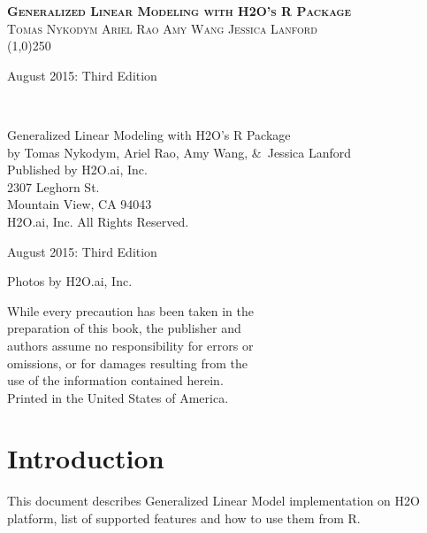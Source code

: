 \documentclass{article}[11pt]
\begin{document}
\thispagestyle{empty} %

\begin{center}
\textsc{\Large\bf{Generalized Linear Modeling  with H2O's R Package}}
\\
\bigskip
\textsc{\small{Tomas Nykodym \hspace{40pt} Ariel Rao \hspace{40pt} Amy Wang \hspace{40pt} Jessica Lanford}}
\\
\bigskip
\line(1,0){250}  %

\bigskip
August 2015: Third Edition 
\\%
\bigskip
\end{center}

{\raggedright\vfill\ 

Generalized Linear Modeling  with H2O's R Package\\
  by Tomas Nykodym, Ariel Rao, Amy Wang, \&\ Jessica Lanford \\
\bigskip
  Published by H2O.ai, Inc. \\
2307 Leghorn St. \\
Mountain View, CA 94043\\
\bigskip
{} H2O.ai, Inc. All Rights Reserved. 
\bigskip

August 2015: Third Edition
\bigskip

Photos by \textcopyright H2O.ai, Inc. 
\bigskip

While every precaution has been taken in the\\
preparation of this book, the publisher and\\
authors assume no responsibility for errors or\\
omissions, or for damages resulting from the\\
use of the information contained herein.\\
\bigskip
Printed in the United States of America. 


}\par

\newpage

\tableofcontents

\newpage

\section{Introduction} \label{1}
This document describes Generalized Linear Model implementation on H2O platform, list of supported features and how to use them from R. 
\end{document}
